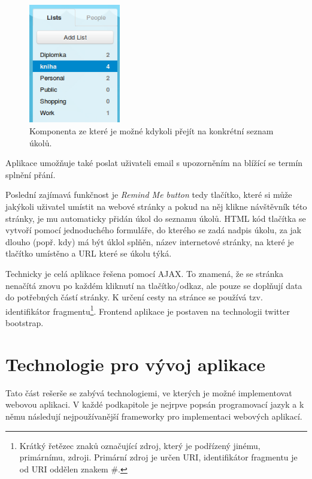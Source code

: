 \begin{figure}[htb]
\begin{center}
\includegraphics[width=40mm]{./pictures/astrid-tasklist.png}
\caption{Komponenta ze které je možné kdykoli přejít na konkrétní seznam úkolů.}
\label{fig:astrid-tasklist}
\end{center}
\end{figure}

Aplikace umožňuje také poslat uživateli email s upozorněním na blížící se termín splnění přání.

Poslední zajímavá funkčnost je \emph{Remind Me button} tedy tlačítko, které si může jakýkoli uživatel umístit na webové stránky a pokud na něj klikne návštěvník této stránky, je mu automaticky přidán úkol do seznamu úkolů. HTML kód tlačítka se vytvoří pomocí jednoduchého formuláře, do kterého se zadá nadpis úkolu, za jak dlouho (popř. kdy) má být úklol splňěn, název internetové stránky, na které je tlačítko umístěno a URL které se úkolu týká.

Technicky je celá aplikace řešena pomocí AJAX. To znamená, že se stránka nenačítá znovu po každém kliknutí na tlačítko/odkaz, ale pouze se doplňují data do potřebných částí stránky. K určení cesty na stránce se používá tzv. identifikátor fragmentu\footnote{Krátký řetězec znaků označující zdroj, který je podřízený jinému, primárnímu, zdroji. Primární zdroj je určen URI, identifikátor fragmentu je od URI oddělen znakem \#.}. Frontend aplikace je postaven na technologii twitter bootstrap.

\section{Technologie pro vývoj aplikace}
Tato část rešerše se zabývá technologiemi, ve kterých je možné implementovat webovou aplikaci. V každé podkapitole je nejrpve popsán programovací jazyk a k němu následují nejpoužívanější frameworky pro implementaci webových aplikací.
